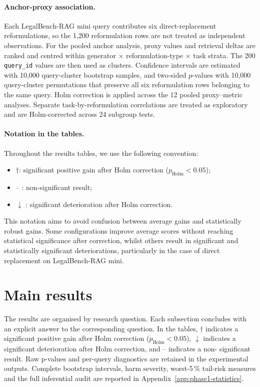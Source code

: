 \documentclass[a4paper,fleqn]{cas-dc}
\begin{document}
\paragraph{Anchor-proxy association.}
Each LegalBench-RAG mini query contributes six direct-replacement
reformulations, so the 1,200 reformulation rows are not treated as
independent observations. For the pooled anchor analysis, proxy values
and retrieval deltas are ranked and centred within generator
$\times$ reformulation-type $\times$ task strata. The 200
\texttt{query\_id} values are then used as clusters. Confidence
intervals are estimated with 10,000 query-cluster bootstrap samples, and
two-sided $p$-values with 10,000 query-cluster permutations that preserve
all six reformulation rows belonging to the same query. Holm correction
is applied across the 12 pooled proxy--metric analyses. Separate
task-by-reformulation correlations are treated as exploratory and are
Holm-corrected across 24 subgroup tests.

\paragraph{Notation in the tables.}
Throughout the results tables, we
use the following convention:

\begin{itemize}
    \item $\dagger$: significant positive gain after
    Holm correction ($p_{\text{Holm}} < 0.05$);
    \item {--} : non-significant result;
    \item $\downarrow$ : significant deterioration
    after Holm correction.
\end{itemize}

This notation aims to avoid confusion between
average gains and statistically robust gains. Some
configurations improve average scores without
reaching statistical significance after correction, whilst
others result in significant and statistically significant
deteriorations, particularly in the case of direct replacement
on LegalBench-RAG mini.

\section{Main results}
\label{sec:main-results}

The results are organised by research question.
Each subsection concludes with an explicit answer
to the corresponding question. In the tables,
$\dagger$ indicates a significant positive gain after
Holm correction ($p_{\text{Holm}} < 0.05$),
$\downarrow$ indicates a significant deterioration after
Holm correction, and {--} indicates a non-
significant result. Raw p-values and per-query diagnostics are retained in the
experimental outputs. Complete bootstrap intervals, harm severity,
worst-5\,\% tail-risk measures and the full inferential audit are
reported in Appendix~\ref{app:phase1-statistics}.
\end{document}
